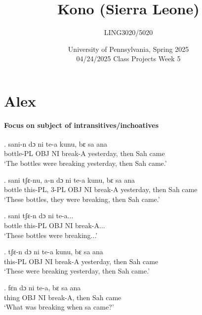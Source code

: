 \documentclass{assets/fieldnotes}
\title{Kono (Sierra Leone)}
\author{LING3020/5020}
\date{University of Pennsylvania, Spring 2025\\04/24/2025 Class Projects Week 5}
\begin{document}
\maketitle

\maketitle
\tableofcontents

\section{Alex}

\paragraph*{Focus on subject of intransitives/inchoatives}

\exg.
sani-n      dɔ    ni   te-a      kunu,        bɛ     sa   ana  \\
bottle-PL   OBJ   NI   break-A   yesterday,   then   Sah   came \\%
`The bottles were breaking yesterday, then Sah came.'

\exg.
sani     tʃɛ-nu,    a-n    dɔ    ni   te-a      kunu,        bɛ     sa    ana  \\
bottle   this-PL,   3-PL   OBJ   NI   break-A   yesterday,   then   Sah   came \\%
`These bottles, they were breaking, then Sah came.' \label{47025}

\exg.
sani     tʃɛ-n     dɔ    ni   te-a...     \\
bottle   this-PL   OBJ   NI   break-A... \\%
`These bottles were breaking...' \label{81039}


\exg.
tʃɛ-n     dɔ    ni   te-a      kunu,        bɛ     sa    ana  \\
this-PL   OBJ   NI   break-A   yesterday,   then   Sah   came \\%
`These were breaking yesterday, then Sah came.'

\exg.
fɛn     dɔ    ni   te-a,      bɛ     sa    ana  \\
thing   OBJ   NI   break-A,   then   Sah   came \\%
`What was breaking when sa came?'
\end{document}

